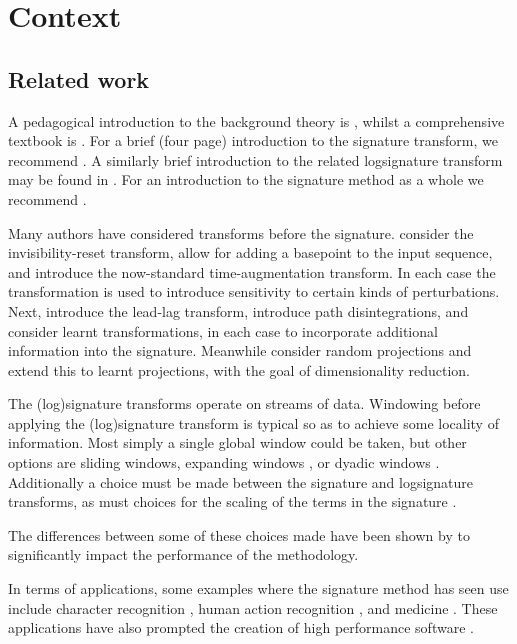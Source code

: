 \documentclass{article}
\theoremstyle{definition}
\theoremstyle{remark}
\begin{document}
	\section{Context}
	\subsection{Related work}
	A pedagogical introduction to the background theory is \citet{levy-lyons}, whilst a comprehensive textbook is \citet{FritzVictoir10}. For a brief (four page) introduction to the signature transform, we recommend \citet[Appendix A]{kidger2019deep}. A similarly brief introduction to the related logsignature transform may be found in \citet[Section 2]{logsig-rnn}. For an introduction to the signature method as a whole we recommend \citet{primer2016}.
	
	Many authors have considered transforms before the signature. \citet{yang2017leveraging, invis-reset} consider the invisibility-reset transform, \citet{signatory} allow for adding a basepoint to the input sequence, and \citet{levin2013learning} introduce the now-standard time-augmentation transform. In each case the transformation is used to introduce sensitivity to certain kinds of perturbations. Next, \citet{flint2016discretely} introduce the lead-lag transform, \citet{yang2017leveraging} introduce path disintegrations, and \citet{kidger2019deep} consider learnt transformations, in each case to incorporate additional information into the signature. Meanwhile \citet{lyons2017sketching} consider random projections and \citet{logsig-rnn} extend this to learnt projections, with the goal of dimensionality reduction.
	
	The (log)signature transforms operate on streams of data. Windowing before applying the (log)signature transform is typical so as to achieve some locality of information. Most simply a single global window could be taken, but other options are sliding windows, expanding windows \citep{kidger2019deep}, or dyadic windows \citep{yang2017leveraging}. Additionally a choice must be made between the signature and logsignature transforms, as must choices for the scaling of the terms in the signature \citep{normsig, primer2016}.

	The differences between some of these choices made have been shown by \citet{fermanian2019embedding} to significantly impact the performance of the methodology.
	
	In terms of applications, some examples where the signature method has seen use include character recognition \citep{yang2016deepwriterid, yang2016rotation, jeremythesis, toth2019gp}, human action recognition \citep{li2017lpsnet,yang2017leveraging,logsig-rnn}, and medicine \citep{arribas2018signature, morrill2019sepsis, howisonutilisation}. These applications have also prompted the creation of high performance software \citep{iisignature, signatory}.
	
\end{document}
